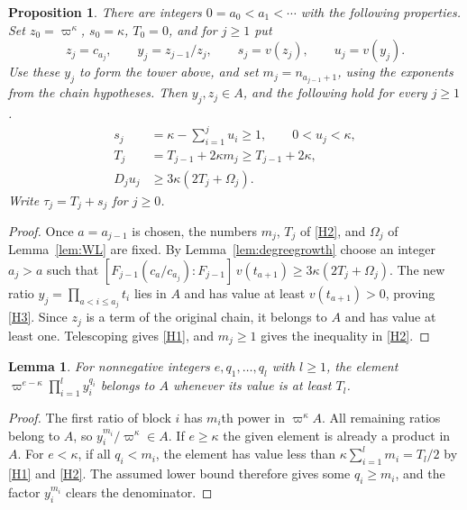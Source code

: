 \documentclass[11pt, letterpaper]{article}
\newtheorem{lemma}[theorem]{Lemma}
\newtheorem{proposition}[theorem]{Proposition}
\theoremstyle{definition}
\theoremstyle{remark}
\begin{document}
\begin{proposition}
    \label{prop:B}
    There are integers $0 = a_{0} < a_{1} < \cdots$ with the following properties.
    Set $z_{0} = \varpi^{\kappa}$, $s_{0} = \kappa$, $T_{0} = 0$, and for $j \ge 1$ put
    \[
        z_{j} = c_{a_{j}}, \qquad y_{j} = z_{j - 1}/z_{j}, \qquad
        s_{j} = v(z_{j}), \qquad u_{j} = v(y_{j}).
    \]
    Use these $y_{j}$ to form the tower above, and set $m_{j} = n_{a_{j - 1} + 1}$, using the exponents from the chain hypotheses.
    Then $y_{j}, z_{j} \in A$, and the following hold for every $j \ge 1$.
    \begin{align}
        s_{j} &= \kappa - \sum_{i = 1}^{j} u_{i} \ge 1,
        \qquad 0 < u_{j} < \kappa, \tag{H1}\label{H1}\\
        T_{j} &= T_{j - 1} + 2\kappa m_{j} \ge T_{j - 1} + 2\kappa, \tag{H2}\label{H2}\\
        D_{j}u_{j} &\ge 3\kappa(2T_{j} + \Omega_{j}). \tag{H3}\label{H3}
    \end{align}
    Write $\tau_{j} = T_{j} + s_{j}$ for $j \ge 0$.
\end{proposition}

\begin{proof}
    Once $a = a_{j - 1}$ is chosen, the numbers $m_{j}$, $T_{j}$ of \eqref{H2}, and $\Omega_{j}$ of Lemma~\ref{lem:WL} are fixed.
    By Lemma~\ref{lem:degreegrowth} choose an integer $a_{j} > a$ such that $[F_{j - 1}(c_{a}/c_{a_{j}}) : F_{j - 1}]\,v(t_{a + 1}) \ge 3\kappa(2T_{j} + \Omega_{j})$.
    The new ratio $y_{j} = \prod_{a < i \le a_{j}} t_{i}$ lies in $A$ and has value at least $v(t_{a + 1}) > 0$, proving \eqref{H3}.
    Since $z_{j}$ is a term of the original chain, it belongs to $A$ and has value at least one.
    Telescoping gives \eqref{H1}, and $m_{j} \ge 1$ gives the inequality in \eqref{H2}.
\end{proof}

\begin{lemma}
    \label{lem:D}
    For nonnegative integers $e, q_{1}, \dots, q_{l}$ with $l \ge 1$, the element $\varpi^{e - \kappa}\prod_{i = 1}^{l} y_{i}^{q_{i}}$ belongs to $A$ whenever its value is at least $T_{l}$.
\end{lemma}

\begin{proof}
    The first ratio of block $i$ has $m_{i}$th power in $\varpi^{\kappa}A$.
    All remaining ratios belong to $A$, so $y_{i}^{m_{i}}/\varpi^{\kappa} \in A$.
    If $e \ge \kappa$ the given element is already a product in $A$.
    For $e < \kappa$, if all $q_{i} < m_{i}$, the element has value less than $\kappa \sum_{i = 1}^{l} m_{i} = T_{l}/2$ by \eqref{H1} and \eqref{H2}.
    The assumed lower bound therefore gives some $q_{i} \ge m_{i}$, and the factor $y_{i}^{m_{i}}$ clears the denominator.
\end{proof}
\end{document}
